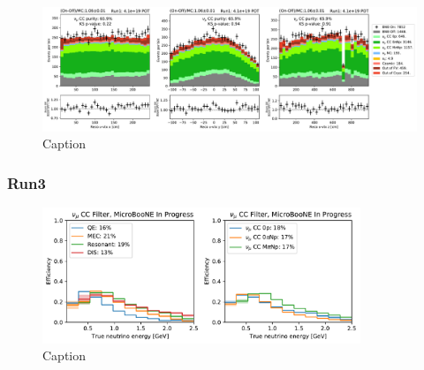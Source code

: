 \begin{figure}
    \centering
    \includegraphics[width=\textwidth]{NuMuCCsel/Images/run1/numu_recovtx_run1.pdf}
    \caption{Caption}
    \label{fig:numu_vtx}
\end{figure}

\subsubsection{Run3}
\label{sssec:NuMUCCsel:INC:Run3}

\begin{figure}
    \centering
    \includegraphics[width=0.85\textwidth]{NuMuCCsel/Images/run3/numu_efficiency_run3.pdf}
    \caption{Caption}
    \label{fig:numu_eff_r3}
\end{figure}



